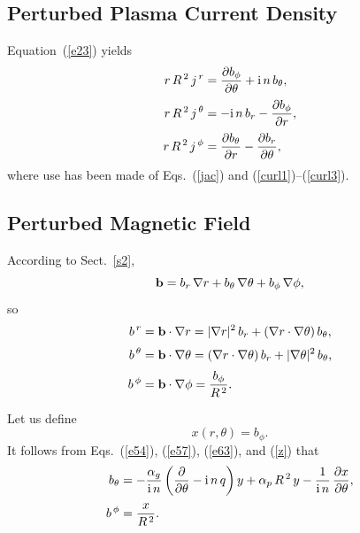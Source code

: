 \documentclass[12pt,prb,aps]{revtex4-1}
\begin{document}
\subsection{Perturbed Plasma Current Density}
Equation~(\ref{e23}) yields 
\begin{align}
r\,R^{\,2}\,j^{\,r} &= \frac{\partial b_\phi}{\partial\theta}+{\rm i}\,n\,b_\theta,\label{e57}\\[0.5ex]
r\,R^{\,2}\,j^{\,\theta} &=-{\rm i}\,n\,b_r -\frac{\partial b_\phi}{\partial r},\label{e58}\\[0.5ex]
r\,R^{\,2}\,j^{\,\phi}&= \frac{\partial b_\theta}{\partial r} -\frac{\partial b_r}{\partial \theta},\label{e59}
\end{align}
where use has been made of Eqs.~(\ref{jac}) and (\ref{curl1})--(\ref{curl3}). 

\subsection{Perturbed Magnetic Field}
According to Sect.~\ref{s2}, 
\begin{equation}
{\bf b} = b_r\,\nabla r + b_\theta\,\nabla\theta+b_\phi\,\nabla\phi,
\end{equation}
so
\begin{align}
b^{\,r} &= {\bf b}\cdot\nabla r = |\nabla r|^2\,b_r + (\nabla r\cdot\nabla\theta)\,b_\theta,\label{e61}\\[0.5ex]
b^{\,\theta} &= {\bf b}\cdot\nabla \theta = (\nabla r\cdot\nabla\theta)\,b_r + |\nabla\theta|^2\,b_\theta,\label{e62}\\[0.5ex]
b^{\,\phi}&={\bf b}\cdot\nabla\phi =\frac{b_\phi}{R^{\,2}}.\label{e63}
\end{align}

Let us define
\begin{equation}\label{z}
x(r,\theta) = b_\phi.
\end{equation}
It follows from Eqs.~(\ref{e54}), (\ref{e57}), (\ref{e63}), and (\ref{z}) that
\begin{align}
b_\theta &= -\frac{\alpha_g}{{\rm i}\,n}\left(\frac{\partial}{\partial \theta}-{\rm i}\,n\,q\right)y+\alpha_p\,R^{\,2}\,y- \frac{1}{{\rm i}\,n}\,\frac{\partial x}{\partial \theta},\label{e65}\\[0.5ex]
b^{\,\phi}&=\frac{x}{R^{\,2}}.\label{e66}
\end{align}
\end{document}

